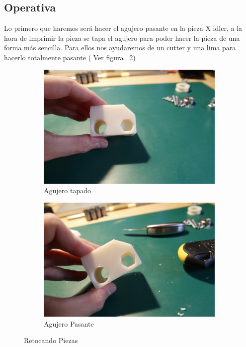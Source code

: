 	\subsection{Operativa}
		Lo primero que haremos será hacer el agujero pasante en la pieza X idler, a la hora de imprimir la pieza se tapa el agujero para poder hacer la pieza de una forma más sencilla. Para ellos nos ayudaremos de un cutter y una lima para hacerlo totalmente pasante ( Ver figura ~\ref{fig:agujero.pasante})\\
			\begin{figure}[H]
			        \centering
			        \begin{subfigure}[htb]{0.4\textwidth}
			                \centering
			                \includegraphics[width=\textwidth]{../../Fotos/48.jpg}
			                \caption{Agujero tapado }
			                \label{fig:agujero.tapado}
			        \end{subfigure}
			        \begin{subfigure}[htb]{0.4\textwidth}
			                \centering
			                \includegraphics[width=\textwidth]{../../Fotos/49.jpg}
			                \caption{Agujero Pasante}
			                \label{fig:agujero.pasante}
			        \end{subfigure}
			        \caption{Retocando Piezas}\label{fig:agujero.xidlr}
			\end{figure}
